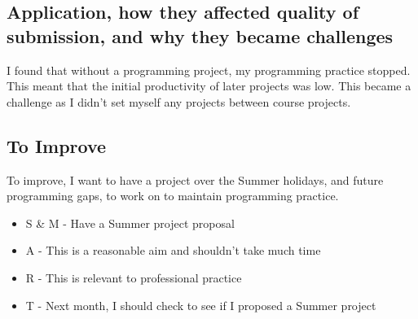 \documentclass{scrartcl}
\begin{document}
\subsection*{Application, how they affected quality of submission, and why they became challenges}
I found that without a programming project, my programming practice stopped. This meant that the initial productivity of later projects was low. This became a challenge as I didn't set myself any projects between course projects.

\subsection*{To Improve}
To improve, I want to have a project over the Summer holidays, and future programming gaps, to work on to maintain programming practice.

 \begin{itemize}
   \item  S \& M - Have a Summer project proposal
	\item A - This is a reasonable aim and shouldn't take much time
	\item R - This is relevant to professional practice
	\item T - Next month, I should check to see if I proposed a Summer project
 \end{itemize}
\end{document}
